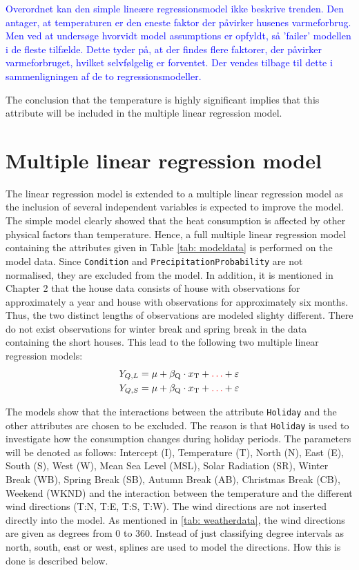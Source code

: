 \noindent \textcolor{blue}{Overordnet kan den simple lineære regressionsmodel ikke beskrive trenden. Den antager, at temperaturen er den eneste faktor der påvirker husenes varmeforbrug. Men ved at undersøge hvorvidt model assumptions er opfyldt, så 'failer' modellen i de fleste tilfælde. Dette tyder på, at der findes flere faktorer, der påvirker varmeforbruget, hvilket selvfølgelig er forventet. Der vendes tilbage til dette i sammenligningen af de to regressionsmodeller.}

The conclusion that the temperature is highly significant implies that this attribute will be included in the multiple linear regression model.

\section{Multiple linear regression model}
The linear regression model is extended to a multiple linear regression model as the inclusion of several independent variables is expected to improve the model. The simple model clearly showed that the heat consumption is affected by other physical factors than temperature. Hence, a full multiple linear regression model containing the attributes given in Table \ref{tab: modeldata} is performed on the model data. Since \texttt{Condition} and \texttt{PrecipitationProbability} are not normalised, they are excluded from the model. In addition, it is mentioned in Chapter 2 that the house data consists of house with observations for approximately a year and house with observations for approximately six months. Thus, the two distinct lengths of observations are modeled slighty different. There do not exist observations for winter break and spring break in the data containing the short houses. This lead to the following two multiple linear regression models: 
\begin{align}
    Y_{Q,L} & = \mu + \beta_{\text{Q}}\cdot x_{\text{T}} + \textcolor{red}{\dots} + \varepsilon \label{eq: multi_L}\\
    Y_{Q,S} & = \mu + \beta_{\text{Q}}\cdot x_{\text{T}} + \textcolor{red}{\dots} + \varepsilon
    \label{eq: multi_S}
\end{align}

\noindent The models show that the interactions between the attribute \texttt{Holiday} and the other attributes are chosen to be excluded. The reason is that \texttt{Holiday} is used to investigate how the consumption changes during holiday periods. The parameters will be denoted as follows: Intercept (I), Temperature (T), North (N), East (E), South (S), West (W), Mean Sea Level (MSL), Solar Radiation (SR), Winter Break (WB), Spring Break (SB), Autumn Break (AB), Christmas Break (CB), Weekend (WKND) and the interaction between the temperature and the different wind directions (T:N, T:E, T:S, T:W). The wind directions are not inserted directly into the model. As mentioned in \cref{tab: weatherdata}, the wind directions are given as degrees from $0$ to $360$. Instead of just classifying degree intervals as north, south, east or west, splines are used to model the directions. How this is done is described below.

